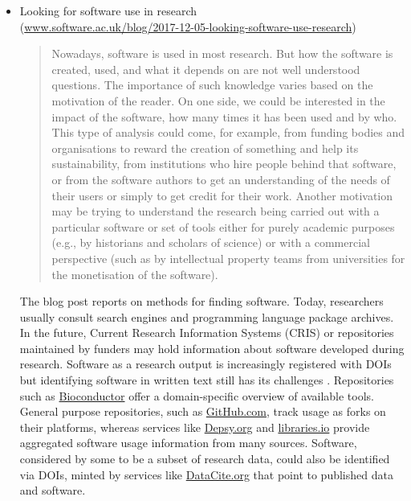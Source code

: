 \documentclass[11pt,letterpaper]{article}
\begin{document}
\begin{itemize}
\item Looking for software use in research \\(\href{https://www.software.ac.uk/blog/2017-12-05-looking-software-use-research}
{www.software.ac.uk/blog/2017-12-05-looking-software-use-research})
\begin{quote}
Nowadays, software is used in most research. But how the software is created, used, and what it depends on are not well understood questions. The importance of such knowledge varies based on the motivation of the reader. On one side, we could be interested in the impact of the software, how many times it has been used and by who. This type of analysis could come, for example, from funding bodies and organisations to reward the creation of something and help its sustainability, from institutions who hire people behind that software, or from the software authors to get an understanding of the needs of their users or simply to get credit for their work. Another motivation may be trying to understand the research being carried out with a particular software or set of tools either for purely academic purposes (e.g., by historians and scholars of science) or with a commercial perspective (such as by intellectual property teams from universities for the monetisation of the software). %
\end{quote}
The blog post reports on methods for finding software. Today, researchers usually consult search engines and programming language package archives. In the future, Current Research Information Systems (CRIS) or repositories maintained by funders may hold information about software developed during research. Software as a research output is increasingly registered with DOIs \cite{Fenner2018DOI} but identifying software in written text still has its challenges \cite{Li2017R}. Repositories such as \href{https://www.bioconductor.org/}{Bioconductor} offer a domain-specific overview of available tools. General purpose repositories, such as \href{http://github.com}{GitHub.com}, track usage as forks on their platforms, whereas services like \href{http://dpesy.org}{Depsy.org} and \href{https://libraries.io/}{libraries.io} provide aggregated software usage information from many sources. %
Software, considered by some to be a subset of research data, could also be identified via DOIs, minted by services like \href{http://datacite.org}{DataCite.org} that point to published data and software. 

\end{itemize}
\end{document}
